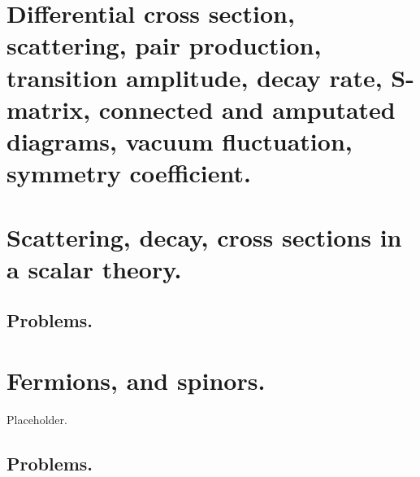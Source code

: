    \chapter{Differential cross section, scattering, pair production, transition amplitude, decay rate, S-matrix, connected and amputated diagrams, vacuum fluctuation, symmetry coefficient.}
      
   \chapter{Scattering, decay, cross sections in a scalar theory.}
      
      \section{Problems.}
         
         
         
   \chapter{Fermions, and spinors.}
      Placeholder.
      \section{Problems.}
         
